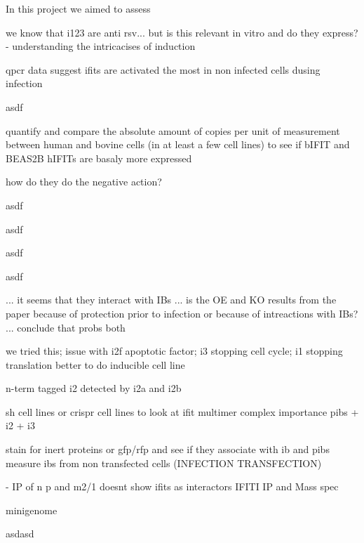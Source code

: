 In this project we aimed to assess 

we know that i123 are anti rsv...
but is this relevant in vitro and do they express?
- understanding the intricacises of induction

qpcr data suggest ifits are activated the most in non infected cells dusing infection

asdf

quantify and compare the absolute amount of copies per unit of measurement between human and bovine cells (in at least a few cell lines) to see if bIFIT and BEAS2B hIFITs are basaly more expressed

how do they do the negative action?

asdf

asdf

asdf

asdf


... it seems that they interact with IBs ... is the OE and KO results from the paper because of protection prior to infection or because of intreactions with IBs? ... conclude that probs both



we tried this; issue with i2f apoptotic factor; i3 stopping cell cycle; i1 stopping translation
better to do inducible cell line

n-term tagged i2 detected by i2a and i2b

sh cell lines or crispr cell lines to look at ifit multimer complex importance
pibs + i2 + i3

stain for inert proteins or gfp/rfp and see if they associate with ib and pibs
measure ibs from non transfected cells (INFECTION TRANSFECTION)

\cite{Oliveira2013HumanCells} - IP of n p and m2/1 doesnt show ifits as interactors
IFITI IP and Mass spec

minigenome

asdasd

